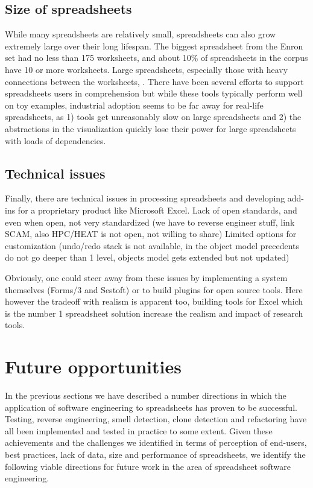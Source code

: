 \documentclass[conference]{IEEEtran}
\begin{document}
\subsection{Size of spreadsheets}
While many spreadsheets are relatively small, spreadsheets can also grow extremely large over their long lifespan. The biggest spreadsheet from the Enron set had no less than 175 worksheets, and about 10\% of spreadsheets in the corpus have 10 or more worksheets. Large spreadsheets, especially those with heavy connections between the worksheets, . There have been several efforts to support spreadsheets users in comprehension  but while these tools typically perform well on toy examples, industrial adoption seems to be far away for real-life spreadsheets, as 1) tools get unreasonably slow on large spreadsheets and 2) the abstractions in the visualization quickly lose their power for large spreadsheets with loads of dependencies. 



\subsection{Technical issues} 
Finally, there are technical issues in processing spreadsheets and developing add-ins for a proprietary product like Microsoft Excel. 
Lack of open standards, and even when open, not very standardized (we have to reverse engineer stuff, link SCAM, also HPC/HEAT is not open, not willing to share)
Limited options for customization (undo/redo stack is not available, in the object model precedents do not go deeper than 1 level, objects model gets extended but not updated)

Obviously, one could steer away from these issues by implementing a system themselves (Forms/3 and Sestoft) or to build plugins for open source tools. Here however the tradeoff with realism is apparent too, building tools for Excel which is the number 1 spreadsheet solution increase the realism and impact of research tools.

\section{Future opportunities}
In the previous sections we have described a number directions in which the application of software engineering to spreadsheets  has proven to be successful. Testing, reverse engineering, smell detection, clone detection and refactoring have all been implemented and tested in practice to some extent. Given these achievements and the challenges we identified in terms of perception of end-users, best practices, lack of data, size and performance of spreadsheets, we identify the following viable directions for future work in the area of spreadsheet software engineering.
\end{document}
